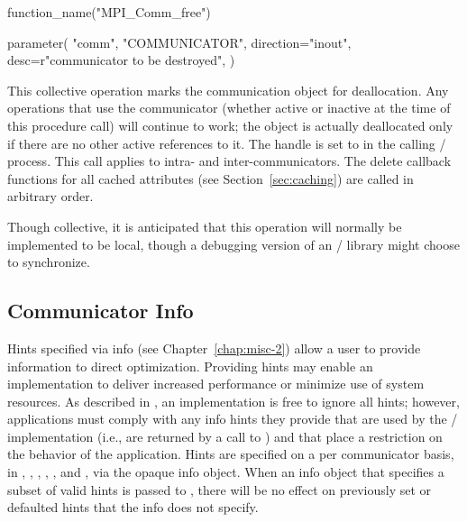 %
\begin{mpi-binding}
    function_name("MPI_Comm_free")
    
    parameter(
        "comm",
        "COMMUNICATOR",
        direction="inout",
        desc=r"communicator to be destroyed",
    )
\end{mpi-binding}

This collective operation marks the communication object for
deallocation.
Any operations that use the communicator  (whether active or inactive at
the time of this procedure call) will continue to work;
the object is actually deallocated only if there are no other active references to it. 
The handle is set to  in the calling \MPI/ process.
This call applies to intra- and inter-communicators. The delete callback
functions for all cached attributes (see Section~\ref{sec:caching}) are
called in arbitrary order.

\begin{implementors}
Though collective, it is anticipated that this operation will normally
be implemented to be local, though
a 
debugging version of an \MPI/ library might
choose to synchronize.
\end{implementors}

\subsection{Communicator Info}
\label{sec:comm-info}

Hints specified via info (see Chapter~\ref{chap:misc-2}) allow a user
to provide information to direct optimization. Providing hints may
enable an implementation to deliver increased performance or minimize
use of system resources. As described in ,
an implementation is free to ignore all hints; however, applications
must comply with any info hints they provide that are used by the \MPI/
implementation (i.e., are returned by a call to
) and that place a restriction on the
behavior of the application.
Hints are specified on a per communicator basis, in
,
,
,
,
, and
,
via the opaque info object. When
an info object that specifies a subset of valid hints is passed to
, there will be no effect on previously
set or defaulted hints that the info does not specify.

